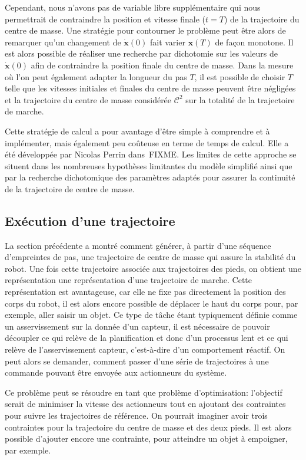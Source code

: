 Cependant, nous n'avons pas de variable libre supplémentaire qui nous
permettrait de contraindre la position et vitesse finale ($t=T$) de la
trajectoire du centre de masse. Une stratégie pour contourner le
problème peut être alors de remarquer qu'un changement de
$\dot{\mathbf{x}}(0)$ fait varier $\mathbf{x}(T)$ de façon
monotone. Il est alors possible de réaliser une recherche par
dichotomie sur les valeurs de $\dot{\mathbf{x}}(0)$ afin de
contraindre la position finale du centre de masse. Dans la mesure où
l'on peut également adapter la longueur du pas $T$, il est possible de
choisir $T$ telle que les vitesses initiales et finales du centre de
masse peuvent être négligées et la trajectoire du centre de masse
considérée $\mathcal{C}^2$ sur la totalité de la trajectoire de
marche.


Cette stratégie de calcul a pour avantage d'être simple à comprendre
et à implémenter, mais également peu coûteuse en terme de temps de
calcul. Elle a été développée par Nicolas Perrin dans FIXME. Les
limites de cette approche se situent dans les nombreuses hypothèses
limitantes du modèle simplifié ainsi que par la recherche dichotomique
des paramètres adaptés pour assurer la continuité de la trajectoire de
centre de masse.


\subsection{Exécution d'une trajectoire}


La section précédente a montré comment générer, à partir d'une
séquence d'empreintes de pas, une trajectoire de centre de masse qui
assure la stabilité du robot. Une fois cette trajectoire associée aux
trajectoires des pieds, on obtient une représentation une
représentation d'une trajectoire de marche. Cette représentation est
avantageuse, car elle ne fixe pas directement la position des corps du
robot, il est alors encore possible de déplacer le haut du corps pour,
par exemple, aller saisir un objet. Ce type de tâche étant typiquement
définie comme un asservissement sur la donnée d'un capteur, il est
nécessaire de pouvoir découpler ce qui relève de la planification et
donc d'un processus lent et ce qui relève de l'asservissement capteur,
c'est-à-dire d'un comportement réactif. On peut alors se demander,
comment passer d'une série de trajectoires à une commande pouvant être
envoyée aux actionneurs du système.


Ce problème peut se résoudre en tant que problème d'optimisation:
l'objectif serait de minimiser la vitesse des actionneurs tout en
ajoutant des contraintes pour suivre les trajectoires de référence. On
pourrait imaginer avoir trois contraintes pour la trajectoire du
centre de masse et des deux pieds. Il est alors possible d'ajouter
encore une contrainte, pour atteindre un objet à empoigner, par
exemple.


